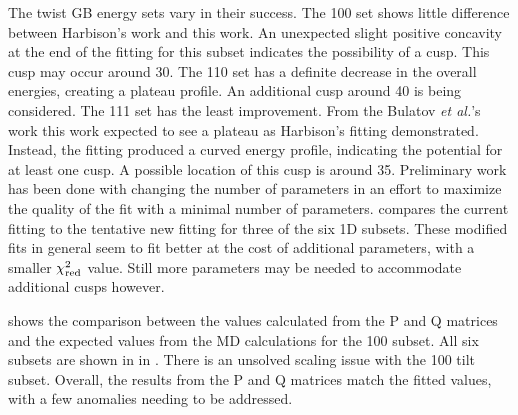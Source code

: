 \documentclass[twoside,senior]{BYUPhys}
\begin{document}
The twist GB energy sets vary in their success.  The \textlangle{}100\textrangle{} set shows little difference between Harbison's \cite{harbison2015} work and this work.  An unexpected slight positive concavity at the end of the fitting for this subset indicates the possibility of a cusp.  This cusp may occur around 30\textdegree{}.  The \textlangle{}110\textrangle{} set has a definite decrease in the overall energies, creating a plateau profile.  An additional cusp around 40\textdegree{} is being considered.  The \textlangle{}111\textrangle{} set has the least improvement.  From the Bulatov \emph{et al.}'s work\cite{bulatov2014} this work expected to see a plateau as Harbison's fitting demonstrated.\cite{harbison2015}  Instead, the fitting produced a curved energy profile, indicating the potential for at least one cusp.  A possible location of this cusp is around 35\textdegree{}.  Preliminary work has been done with changing the number of parameters in an effort to maximize the quality of the fit with a minimal number of parameters.  compares the current fitting to the tentative new fitting for three of the six 1D subsets.  These modified fits in general seem to fit better at the cost of additional parameters, with a smaller $\chi_{\textnormal{red}}^2$ value.  Still more parameters may be needed to accommodate additional cusps however.

 shows the comparison between the values calculated from the P and Q matrices and the expected values from the MD calculations for the \textlangle{}100\textrangle{} subset.  All six subsets are shown in  in .  There is an unsolved scaling issue with the \textlangle{}100\textrangle{} tilt subset.  Overall, the results from the P and Q matrices match the fitted values, with a few anomalies needing to be addressed.
\end{document}
